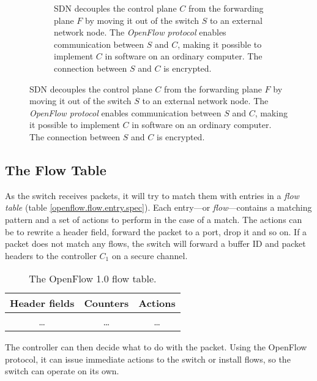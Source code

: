 \begin{figure}
\begin{subfigure}[t]{0.45\textwidth}
    \caption{\ac{SDN} decouples the control plane $C$ from the forwarding
      plane $F$ by moving it out of the switch $S$ to an external network
        node.  The \textit{OpenFlow protocol} enables communication between
        $S$ and $C$, making it possible to implement $C$ in software on an
        ordinary computer. The connection between $S$ and $C$ is encrypted.}
    \label{figure:decoupling.planes}
  \end{subfigure}
\end{figure}

\subsection{The Flow Table}
\label{chapter:theory.flow.table}

As the switch receives packets, it will try to match them with entries in a
\textit{flow table} (table \vref{openflow.flow.entry.spec}).
%
Each entry---or \textit{flow}---contains a matching pattern and a set of
actions to perform in the case of a match.  The actions can be to rewrite
a header field, forward the packet to a port, drop it and so on.
%
If a packet does not match any flows, the switch will forward a buffer ID
and packet headers to the controller $C_1$ on a secure channel.

\begin{table}[H]
  \centering
  \begin{tabular}{|c|c|c|}
    \hline \textbf{Header fields} &
           \textbf{Counters} &
           \textbf{Actions} \\
    \hline \dots & \dots & \dots \\
  \end{tabular}

  \caption{The OpenFlow 1.0 flow table.}
  \label{openflow.flow.entry.spec}
\end{table}

The controller can then decide what to do with the packet.  Using the
OpenFlow protocol, it can issue immediate actions to the switch or install
flows, so the switch can operate on its own.


